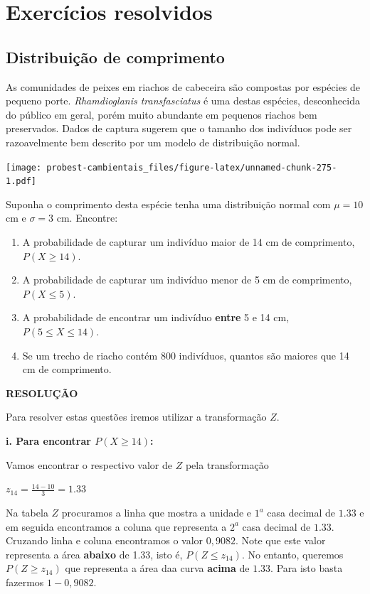 \documentclass[
]{book}
\providecommand{\tightlist}{%
  \setlength{\itemsep}{0pt}\setlength{\parskip}{0pt}}
\begin{document}
\hypertarget{exercuxedcios-resolvidos}{%
\section{Exercícios resolvidos}\label{exercuxedcios-resolvidos}}

\hypertarget{distribuiuxe7uxe3o-de-comprimento}{%
\subsection{Distribuição de comprimento}\label{distribuiuxe7uxe3o-de-comprimento}}

As comunidades de peixes em riachos de cabeceira são compostas por espécies de pequeno porte. \emph{Rhamdioglanis transfasciatus} é uma destas espécies, desconhecida do público em geral, porém muito abundante em pequenos riachos bem preservados. Dados de captura sugerem que o tamanho dos indivíduos pode ser razoavelmente bem descrito por um modelo de distribuição normal.

\texttt{[image: probest-cambientais\_files/figure-latex/unnamed-chunk-275-1.pdf]}

Suponha o comprimento desta espécie tenha uma distribuição normal com \(\mu = 10\) cm e \(\sigma = 3\) cm. Encontre:

\begin{enumerate}
\def\labelenumi{\roman{enumi}.}
\tightlist
\item
  A probabilidade de capturar um indivíduo maior de 14 cm de comprimento, \(P(X \ge 14)\).
\item
  A probabilidade de capturar um indivíduo menor de 5 cm de comprimento, \(P(X \le 5)\).
\item
  A probabilidade de encontrar um indivíduo \textbf{entre} 5 e 14 cm, \(P(5 \le X \le 14)\).
\item
  Se um trecho de riacho contém 800 indivíduos, quantos são maiores que 14 cm de comprimento.
\end{enumerate}

\textbf{RESOLUÇÃO}

Para resolver estas questões iremos utilizar a transformação \(Z\).

\textbf{i. Para encontrar \(P(X \ge 14)\):}

Vamos encontrar o respectivo valor de \(Z\) pela transformação

\(z_{14} = \frac{14 - 10}{3} = 1.33\)

Na tabela \(Z\) procuramos a linha que mostra a unidade e \(1^a\) casa decimal de \(1.33\) e em seguida encontramos a coluna que representa a \(2^a\) casa decimal de \(1.33\). Cruzando linha e coluna encontramos o valor \(0,9082\). Note que este valor representa a área \textbf{abaixo} de 1.33, isto é, \(P(Z \le z_{14})\). No entanto, queremos \(P(Z \ge z_{14})\) que representa a área daa curva \textbf{acima} de \(1.33\). Para isto basta fazermos \(1 - 0,9082\).
\end{document}
